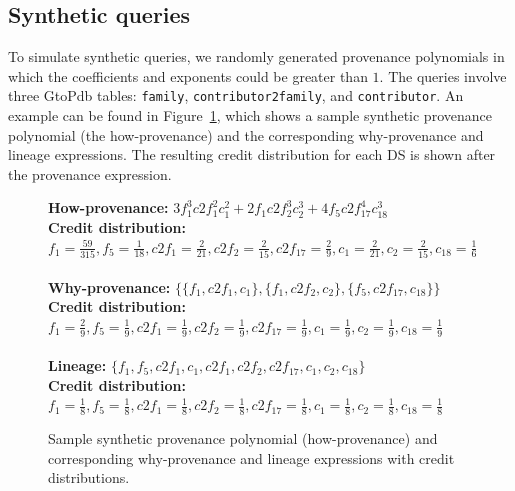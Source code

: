 \subsection{Synthetic queries}
\label{sec:synth_queries}

To simulate synthetic queries, 
we randomly generated provenance polynomials in which the coefficients and exponents could be greater than $1$.
The queries involve three GtoPdb tables: \texttt{family}, \texttt{contributor2family}, and \texttt{contributor}. An example can be found in Figure~\ref{fig:syntheticDistributions}, which shows a sample synthetic provenance polynomial (the how-provenance) and the corresponding why-provenance and lineage expressions.  The resulting credit distribution for each DS is shown after the provenance expression. 



\begin{figure}
{\footnotesize{\bf How-provenance:}
$
3 f_1^3 c2f_1^2 c_1^2 + 2 f_1 c2f_2^3 c_2^3 + 4 f_5 c2f_{17}^4 c_{18}^3
$ }\\
\hspace{0.5in} 
{\footnotesize{\bf Credit distribution:}\\ $f_1 = \frac{59}{315}, f_5 = \frac{1}{18}, c2f_1 = \frac{2}{21}, c2f_2 = \frac{2}{15}, 
c2f_{17}=\frac{2}{9} , c_1 = \frac{2}{21}, c_2 = \frac{2}{15}, c_{18} = \frac{1}{6} 
$
}
\\
\\
{\footnotesize{\bf Why-provenance:}
$
\{ \{f_1, c2f_1, c_1\}, \{f_1, c2f_2, c_2\}, \{ f_5, c2f_{17}, c_{18}\} \}
$ 
}
\\
{\footnotesize{\bf Credit distribution:}\\
$
f_1 = \frac{2}{9}, f_5 = \frac{1}{9}, c2f_1 = \frac{1}{9}, c2f_2 = \frac{1}{9}, 
c2f_{17}=\frac{1}{9} , c_1 = \frac{1}{9}, c_2 = \frac{1}{9}, c_{18} = \frac{1}{9} 
$
}
\\
\\
{\footnotesize{\bf Lineage: }
$
\{f_1, f_5, c2f_1, c_1, c2f_1, c2f_2, c2f_{17}, c_1, c_2, c_{18} \}
$}
\\
{\footnotesize{\bf Credit distribution:}\\
$
f_1 = \frac{1}{8}, f_5 = \frac{1}{8}, c2f_1 = \frac{1}{8}, c2f_2 = \frac{1}{8}, 
c2f_{17}=\frac{1}{8} , c_1 = \frac{1}{8}, c_2 = \frac{1}{8}, c_{18} = \frac{1}{8} 
$}
 \caption{Sample synthetic provenance polynomial (how-provenance) and corresponding why-provenance and lineage expressions with credit distributions.}
 \label{fig:syntheticDistributions}
 \end{figure}

